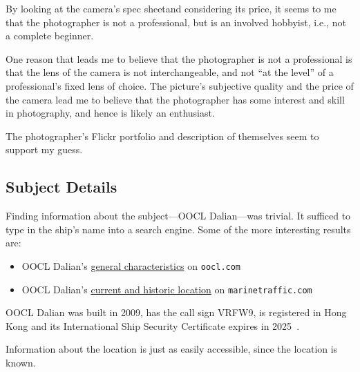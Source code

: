 \documentclass[parskip=half]{scrartcl}
\begin{document}
By looking at the camera's spec sheet\footnotemark and considering its price, it
seems to me that the photographer is not a professional, but is an involved
hobbyist, i.e., not a complete beginner.

One reason that leads me to believe that the photographer is not a professional
is that the lens of the camera is not interchangeable, and not ``at the level''
of a professional's fixed lens of choice. The picture's subjective quality and
the price of the camera lead me to believe that the photographer has some
interest and skill in photography, and hence is likely an enthusiast.

The photographer's Flickr portfolio and description of themselves seem to
support my guess.

\subsection{Subject Details}

Finding information about the subject---OOCL Dalian---was trivial. It sufficed
to type in the ship's name into a search engine. Some of the more interesting
results are:
\begin{itemize}
    \item ​OOCL Dalian's
    \href{https://www.oocl.com/eng/ourservices/vessels/pclass4500/Pages/oocldalian.aspx}
    {general characteristics} on \texttt{oocl.com}
    \item OOCL Dalian's
    \href{https://www.marinetraffic.com/en/ais/details/ships/shipid:688458/mmsi:477627800/imo:9445526/vessel:OOCL_DALIAN}
    {current and historic location} on \texttt{marinetraffic.com}
\end{itemize}

OOCL Dalian was built in 2009, has the call sign VRFW9, is registered in Hong
Kong and its International Ship Security Certificate expires in
2025~\cite{oocldalian}.

Information about the location is just as easily accessible, since the location
is known.

\printbibliography[heading=bibintoc]
\end{document}
